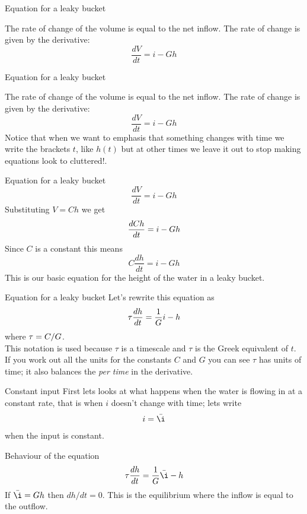 \documentclass{beamer}
\newcommand{\crish}{\color{reddish}}
\newcommand{\cbla}{\color{black}}
\newcommand{\cblu}{\color{blue}}
\begin{document}
\begin{frame}{Equation for a leaky bucket}

  The rate of change of the volume is equal to the net inflow. The
  rate of change is given by the derivative:\crish
  $$\frac{dV}{dt}=i-Gh$$
  \cbla{}
\end{frame}


\begin{frame}{Equation for a leaky bucket}

  The rate of change of the volume is equal to the net inflow. The
  rate of change is given by the derivative:\crish
  $$\frac{dV}{dt}=i-Gh$$
  \cbla{}Notice that when we want to emphasis that something changes with time we write the brackets \crish$t$\cbla, like \crish$h(t)$\cbla{} but at other times we leave it out to stop making equations look to cluttered!\cbla.
\end{frame}


\begin{frame}{Equation for a leaky bucket}
  \crish
  $$\frac{dV}{dt}=i-Gh$$
  \cbla{}Substituting \crish$V=Ch$\cbla{} we get\crish
  $$\frac{d\cblu Ch\crish}{dt}=i-Gh$$
  \cbla{}Since \crish$C$\cbla{} is a constant this means\crish
  $$C\frac{dh}{dt}=i-Gh$$\cbla
  This is our basic equation for the height of the water in a leaky bucket.
\end{frame}


\begin{frame}{Equation for a leaky bucket}
  Let's rewrite this equation as 
  \crish
  $$\cblu\tau\crish\frac{dh}{dt}=\frac{1}{G}i-h$$\cbla where
  \cblu$\tau\crish{}=C/G$\cbla{}.\\[1cm]
  This notation is used because
  \cblu$\tau$\cbla{} is a timescale and \crish$\tau$\cbla{} is the
  Greek equivalent of \crish$t$\cbla. If you work out all the units for the constants \crish$C$\cbla{} and \crish$G$\cbla{} you can see \cblu$\tau$\cbla{} has units of time; it also balances the \textsl{per time} in the derivative. 
\end{frame}

\begin{frame}{Constant input}
  First lets looks at what happens when the water is flowing in at a constant rate, that is when \crish$i$\cbla{} doesn't change with time; lets write\cblu{}
  $$i=\bar{\i}$$\cbla{} when the input is constant.
\end{frame}

\begin{frame}{Behaviour of the equation}
  \crish
  $$\tau\frac{dh}{dt}=\frac{1}{G}\bar{\i}-h$$\cbla If
  \cblu{}$\bar{\i}=Gh$\cbla{} then \cblu{}$dh/dt=0$\cbla{}. This is
  the equilibrium where the inflow is equal to the outflow.
\end{frame}
\end{document}
